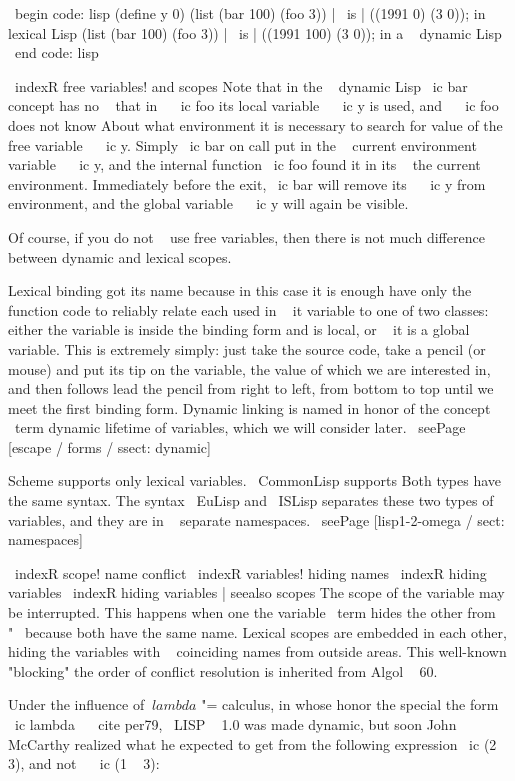 {{\ begin {code: lisp}
(define y 0)
(list (bar 100) (foo 3)) | \ is | ((1991 0) (3 0)); in lexical Lisp
(list (bar 100) (foo 3)) | \ is | ((1991 100) (3 0)); in a ~ dynamic Lisp
\ end {code: lisp}

\ indexR {free variables! and scopes}
Note that in the ~ dynamic Lisp \ ic {bar} concept has no ~ that
in ~ \ ic {foo} its local variable ~ \ ic {y} is used, and ~ \ ic {foo} does not know
About what environment it is necessary to search for value of the free
variable ~ \ ic {y}. Simply \ ic {bar} on call put in the ~ current environment
variable ~ \ ic {y}, and the internal function \ ic {foo} found it in its ~
the current environment. Immediately before the exit, \ ic {bar} will remove its ~ \ ic {y} from
environment, and the global variable ~ \ ic {y} will again be visible.

Of course, if you do not ~ use free variables, then there is not much difference between
dynamic and lexical scopes.

Lexical binding got its name because in this case it is enough
have only the function code to reliably relate each used in ~ it
variable to one of two classes: either the variable is inside the binding
form and is local, or ~ it is a global variable. This is extremely
simply: just take the source code, take a pencil (or mouse) and put
its tip on the variable, the value of which we are interested in, and then follows
lead the pencil from right to left, from bottom to top until we meet the first
binding form. Dynamic linking is named in honor of the concept
\ term {dynamic lifetime} of variables, which we will consider
later. \ seePage [escape / forms / ssect: dynamic]

Scheme supports only lexical variables. { \ CommonLisp } supports
Both types have the same syntax. The syntax { \ EuLisp } and { \ ISLisp } separates these
two types of variables, and they are in ~ separate namespaces.
\ seePage [lisp1-2-omega / sect: namespaces]

\ indexR {scope! name conflict}
\ indexR {variables! hiding names}
\ indexR {hiding variables}
\ indexR {hiding variables | seealso {scopes}}
The scope of the variable may be interrupted. This happens when one
the variable \ term {hides} the other from "~ because both have the same name.
Lexical scopes are embedded in each other, hiding the variables
with ~ coinciding names from outside areas. This well-known "blocking"
the order of conflict resolution is inherited from Algol ~ 60.

Under the influence of $ \ lambda $ "= calculus, in whose honor the special
the form \ ic {lambda} ~ \ cite {per79}, \ LISP ~ 1.0 was made dynamic, but soon
John ~ McCarthy realized what he expected to get from the following expression
\ ic {(2 ~ 3)}, and not ~ \ ic {(1 ~ 3)}:

}}
